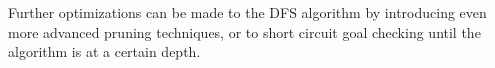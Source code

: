 \documentclass[conference]{IEEEtran}
\begin{document}
Further optimizations can be made to the DFS algorithm by introducing even more advanced pruning techniques, or to short circuit goal checking until the algorithm is at a certain depth. 


%



%
%





%
\end{document}
